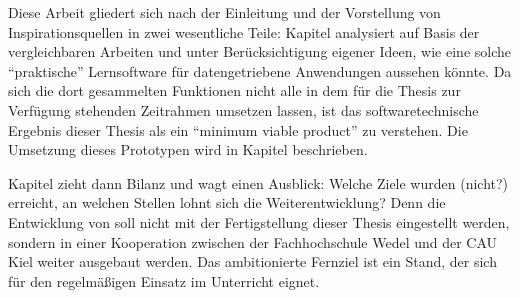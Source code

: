 Diese Arbeit gliedert sich nach der Einleitung und der Vorstellung von Inspirationsquellen in zwei wesentliche Teile: Kapitel  analysiert auf Basis der vergleichbaren Arbeiten und unter Berücksichtigung eigener Ideen, wie eine solche "`praktische"' Lernsoftware für datengetriebene Anwendungen aussehen könnte. Da sich die dort gesammelten Funktionen nicht alle in dem für die Thesis zur Verfügung stehenden Zeitrahmen umsetzen lassen, ist das softwaretechnische Ergebnis dieser Thesis als ein "`minimum viable product"' zu verstehen. Die Umsetzung dieses Prototypen wird in Kapitel  beschrieben.

Kapitel  zieht dann Bilanz und wagt einen Ausblick: Welche Ziele wurden (nicht?) erreicht, an welchen Stellen lohnt sich die Weiterentwicklung? Denn die Entwicklung von \idename{} soll nicht mit der Fertigstellung dieser Thesis eingestellt werden, sondern in einer Kooperation zwischen der Fachhochschule Wedel und der CAU Kiel weiter ausgebaut werden. Das ambitionierte Fernziel ist ein Stand, der sich für den regelmäßigen Einsatz im Unterricht eignet.


